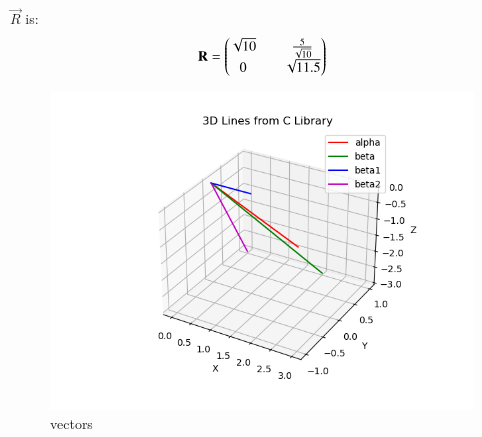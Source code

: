 \documentclass[journal]{IEEEtran}
\theoremstyle{remark}
\begin{document}
$\vec{R}$ is:
\begin{align}
    \mathbf{R}=\begin{pmatrix}\sqrt{10} && \frac{5}{\sqrt{10}}\\0 &&\sqrt{11.5}\end{pmatrix}
\end{align}
\newpage
\begin{figure}[H]
    \centering
    \includegraphics[width=0.9\columnwidth]{figs/fig2.png}
    \caption{vectors}
    \label{fig:placeholder_1}
\end{figure}
\end{document}
